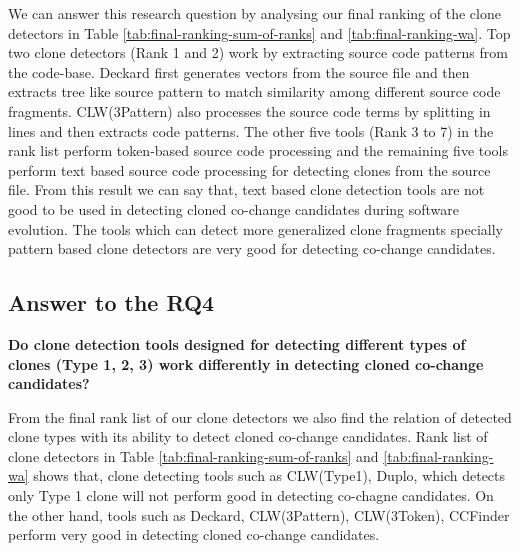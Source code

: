 \documentclass[review]{elsarticle}
\begin{document}
We can answer this research question by analysing our final ranking of the clone detectors in Table \ref{tab:final-ranking-sum-of-ranks} and \ref{tab:final-ranking-wa}. Top two clone detectors (Rank 1 and 2) work by extracting source code patterns from the code-base. Deckard first generates vectors from the source file and then extracts tree like source pattern to match similarity among different source code fragments. CLW(3Pattern) also processes the source code terms by splitting in lines and then extracts code patterns. The other five tools (Rank 3 to 7) in the rank list perform token-based source code processing and the remaining five tools perform text based source code processing for detecting clones from the source file. From this result we can say that, text based clone detection tools are not good to be used in detecting cloned co-change candidates during software evolution. The tools which can detect more generalized clone fragments specially pattern based clone detectors are very good for detecting co-change candidates. 

\subsection{Answer to the \textbf{RQ4}}
\textbf{Do clone detection tools designed for detecting different types of clones (Type 1, 2, 3) work differently in detecting cloned co-change candidates?}

From the final rank list of our clone detectors we also find the relation of detected clone types with its ability to detect cloned co-change candidates. Rank list of clone detectors in Table \ref{tab:final-ranking-sum-of-ranks} and \ref{tab:final-ranking-wa} shows that, clone detecting tools such as CLW(Type1), Duplo, which detects only Type 1 clone will not perform good in detecting co-chagne candidates. On the other hand, tools such as Deckard, CLW(3Pattern), CLW(3Token), CCFinder perform very good in detecting cloned co-change candidates. 
\end{document}
